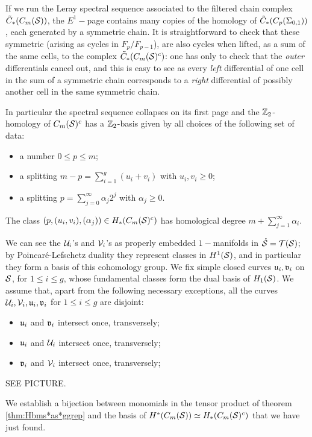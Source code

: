 If we run the Leray spectral sequence associated to the filtered chain complex $\tCh_*(\cms)$,
the $E^1-$page contains many copies of the homology of $\tCh_*(C_p(\Sigma_{0,1}))$,
each generated by a symmetric chain. It is straightforward to check that these symmetric
(arising as cycles in $F_p/F_{p-1}$), are also cycles when lifted, as a sum of the same
cells, to the complex $\tCh_*(\cms^c)$: one has only to check that the \emph{outer}
differentials cancel out, and this is easy to see as every \emph{left} differential
of one cell in the sum of a symmetric chain corresponds to a \emph{right} differential
of possibly another cell in the same symmetric chain.

In particular the spectral sequence collapses on its first page and the $\Z_2$-homology of
$\cms^c$ has a $\Z_2$-basis given by all choices of the following set of data:
\begin{itemize}
 \item a number $0\leq p\leq m$;
 \item a splitting $m-p=\sum_{i=1}^g (u_i+v_i)$ with $u_i,v_i\geq 0$;
 \item a splitting $p=\sum_{j=0}^{\infty}\alpha_j2^j$ with $\alpha_j\geq 0$.
\end{itemize}
The class $(p,(u_i,v_i),(\alpha_j))\in H_*(\cms^c)$ has homological degree
$m+\sum_{j=1}^{\infty}\alpha_i$.

\begin{defn}
 \label{defn:dualHbasis}
We can see the $\U_i$'s and $\V_i$'s as properly embedded $1-$manifolds in $\mrS=\T(\S)$;
by Poincaré-Lefschetz duality they represent classes in $H^1(\S)$, and in particular they form a basis
of this cohomology group. We fix simple closed curves $\u_i,\v_i$ on $\S$, for $1\leq i\leq g$, whose fundamental classes
form the dual basis of $H_1(\S)$. We assume that, apart from the following necessary exceptions,
all the curves $\U_i,\V_i,\u_i,\v_i$ for $1\leq i\leq g$ are disjoint:
\begin{itemize}
 \item $\u_i$ and $\v_i$ intersect once, transversely;
 \item $\u_i$ and $\U_i$ intersect once, transversely;
 \item $\v_i$ and $\V_i$ intersect once, transversely;
 \end{itemize}
SEE PICTURE.
\end{defn}
We establish a bijection between monomials in the tensor product of theorem  \ref{thm:Hbms*as*ggrep}
and the basis of $H^*(\cms)\simeq H_*(\cms^c)$ that we have just found.

